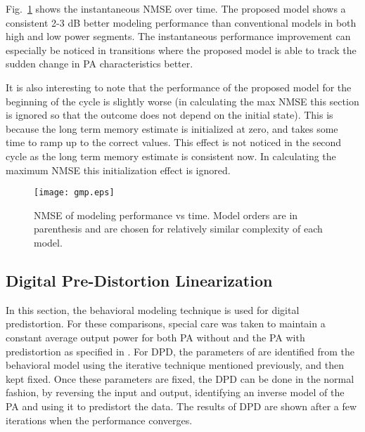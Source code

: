 \documentclass[journal]{IEEEtran}
\begin{document}
Fig.~\ref{NMSE_performance} shows the instantaneous NMSE over time. The proposed model shows a consistent 2-3 dB better modeling performance than conventional models in both high and low power segments. The instantaneous performance improvement can especially be noticed in transitions where the proposed model is able to track the sudden change in PA characteristics better.


It is also interesting to note that the performance of the proposed model for the beginning of the cycle is slightly worse (in calculating the max NMSE this section is ignored so that the outcome does not depend on the initial state). This is because the long term memory estimate is initialized at zero, and takes some time to ramp up to the correct values. This effect is not noticed in the second cycle as the long term memory estimate is consistent now. In calculating the maximum NMSE this initialization effect is ignored.
\begin{figure}
\centering
\texttt{[image: gmp.eps]}
\caption{NMSE of modeling performance vs time. Model orders are in parenthesis and are chosen for relatively similar complexity of each model.} \label{NMSE_performance}
\end{figure}

\subsection{Digital Pre-Distortion Linearization}
In this section, the behavioral modeling technique is used for digital predistortion. For these comparisons, special care was taken to maintain a constant average output power for both PA without and the PA with predistortion as specified in \cite{zhudpd}. For DPD, the parameters of  are identified from the behavioral model using the iterative technique mentioned previously, and then kept fixed. Once these parameters are fixed, the DPD can be done in the normal fashion, by reversing the input and output, identifying an inverse model of the PA and using it to predistort the data. The results of DPD are shown after a few iterations when the performance converges.
\end{document}
